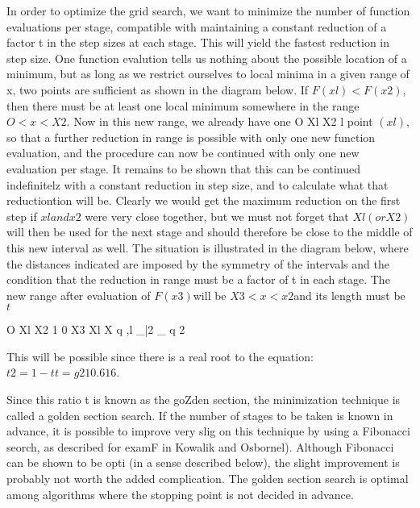      In order to optimize the grid search, we want to minimize the
number of function evaluations per stage, compatible with maintaining
a constant reduction of a factor t in the step sizes at each stage.
This will yield the fastest reduction in step size.  One function evalution
tells us nothing about the possible location of a minimum, but as
long as we restrict ourselves to local minima in a given range of x, two
points are sufficient as shown in the diagram below. If $F(xl) < F(x2)$,
                                      then there must be at least one
                                      local minimum somewhere in the
                                      range $O < x < X2$. Now in this
                                      new range, we already have one
O          Xl     X2          l       point $(xl)$, so that a further
                                      reduction in range is possible
                                      with only one new function evaluation,
 and the procedure can now be continued with only one new evaluation
per stage.  It remains to be shown that this can be continued indefinitelz
with a constant reduction in step size, and to calculate what that
reductiontion will be. Clearly we would get the maximum reduction on the
first step if $xl and x2$
were very close together, but we must not forget that
$Xl (or X2)$will then be used for the next stage and should therefore be
close to the middle of this new interval as well.  The situation is
illustrated in the diagram below, where the distances indicated are
imposed by the symmetry of the intervals and the condition that the
reduction in range must be a factor of t in each stage.  The new range
after evaluation of $F(x3)$will be $X3 < x < x2$and
its length must be $t$
 
 
 
O         Xl     X2        1        0     X3 Xl     X
                                 q                  ,l _|2 _ q
                                             2
 
 
This will be possible since there is a real root to the equation:
                                  $t2 = 1- t
                                  t  = g2 1  0.616 $.
 
 
Since this ratio t is known as the goZden section, the minimization
technique is called a golden section search.  If the number of stages
to be taken is known in advance, it is possible to improve very slig
on this technique by using a Fibonacci seorch, as described for examF
in Kowalik and Osbornel).  Although Fibonacci can be shown to be opti
(in a sense described below), the slight improvement is probably not
worth the added complication.  The golden section search is optimal
among algorithms where the stopping point is not decided in advance.
 
